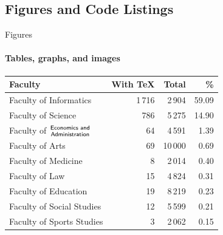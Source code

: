 \documentclass{beamer}
\begin{document}
\begin{darkframes}
  \subsection{Figures and Code Listings}
  \begin{frame}[label=figs1]{Figures}
    \framesubtitle{Tables, graphs, and images}
    \begin{table}[!b]
      {\carlitoTLF %
        \begin{tabularx}{\textwidth}{Xrrr}
          \textbf{Faculty}          & \textbf{With \TeX} & \textbf{Total} &
          \textbf{\%}                                                       \\
          \toprule
          Faculty of Informatics    & 1\,716             & 2\,904         &
          59.09                                                             \\%
          Faculty of Science        & 786                & 5\,275         &
          14.90                                                             \\%
          Faculty of $\genfrac{}{}{0pt}{}{\textsf{Economics and}}{%
          \textsf{Administration}}$ & 64                 & 4\,591         &
          1.39                                                              \\%
          Faculty of Arts           & 69                 & 10\,000        &
          0.69                                                              \\%
          Faculty of Medicine       & 8                  & 2\,014         &
          0.40                                                              \\%
          Faculty of Law            & 15                 & 4\,824         &
          0.31                                                              \\%
          Faculty of Education      & 19                 & 8\,219         &
          0.23                                                              \\%
          Faculty of Social Studies & 12                 & 5\,599         &
          0.21                                                              \\%
          Faculty of Sports Studies & 3                  & 2\,062         &
          0.15                                                              \\%

\end{tabularx}}
\end{table}
\end{frame}
\end{darkframes}
\end{document}
